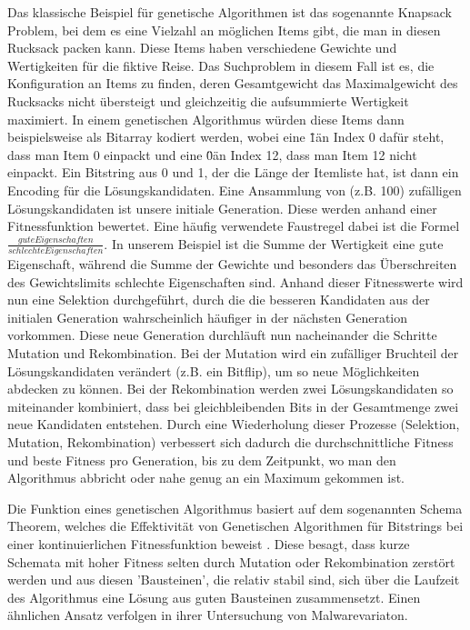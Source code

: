 Das klassische Beispiel für genetische Algorithmen ist das sogenannte Knapsack Problem, bei dem es eine Vielzahl an möglichen Items gibt, die man in diesen Rucksack packen kann. Diese Items haben verschiedene Gewichte und Wertigkeiten für die fiktive Reise. Das Suchproblem in diesem Fall ist es, die Konfiguration an Items zu finden, deren Gesamtgewicht das Maximalgewicht des Rucksacks nicht übersteigt und gleichzeitig die aufsummierte Wertigkeit maximiert.
In einem genetischen Algorithmus würden diese Items dann beispielsweise als Bitarray kodiert werden, wobei eine \"1\" an Index 0 dafür steht, dass man Item 0 einpackt und eine \"0\" an Index 12, dass man Item 12 nicht einpackt. Ein Bitstring aus 0 und 1, der die Länge der Itemliste hat, ist dann ein Encoding für die Lösungskandidaten. Eine Ansammlung von (z.B. 100) zufälligen Lösungskandidaten ist unsere initiale Generation. Diese werden anhand einer Fitnessfunktion bewertet. Eine häufig verwendete Faustregel dabei ist die Formel $ \frac{gute Eigenschaften}{schlechte Eigenschaften}$. In unserem Beispiel ist die Summe der Wertigkeit eine gute Eigenschaft, während die Summe der Gewichte und besonders das Überschreiten des Gewichtslimits schlechte Eigenschaften sind. Anhand dieser Fitnesswerte wird nun eine Selektion durchgeführt, durch die die besseren Kandidaten aus der initialen Generation wahrscheinlich häufiger in der nächsten Generation vorkommen. Diese neue Generation durchläuft nun nacheinander die Schritte Mutation und Rekombination. Bei der Mutation wird ein zufälliger Bruchteil der Lösungskandidaten verändert (z.B. ein Bitflip), um so neue Möglichkeiten abdecken zu können. Bei der Rekombination werden zwei Lösungskandidaten so miteinander kombiniert, dass bei gleichbleibenden Bits in der Gesamtmenge zwei neue Kandidaten entstehen. Durch eine Wiederholung dieser Prozesse (Selektion, Mutation, Rekombination) verbessert sich dadurch die durchschnittliche Fitness und beste Fitness pro Generation, bis zu dem Zeitpunkt, wo man den Algorithmus abbricht oder nahe genug an ein Maximum gekommen ist.

Die Funktion eines genetischen Algorithmus basiert auf dem sogenannten Schema Theorem, welches die Effektivität von Genetischen Algorithmen für Bitstrings bei einer kontinuierlichen Fitnessfunktion beweist \cite{holland_1992_adaptation}. Diese besagt, dass kurze Schemata mit hoher Fitness selten durch Mutation oder Rekombination zerstört werden und aus diesen 'Bausteinen', die relativ stabil sind, sich über die Laufzeit des Algorithmus eine Lösung aus guten Bausteinen zusammensetzt. Einen ähnlichen Ansatz verfolgen \cite{song_2022_mabmalware} in ihrer Untersuchung von Malwarevariaton.

